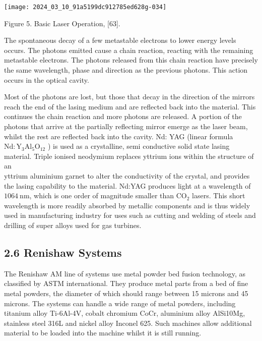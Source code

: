 \documentclass[10pt]{article}
\begin{document}
\begin{center}
\texttt{[image: 2024\_03\_10\_91a5199dc912785ed628g-034]}
\end{center}

Figure 5. Basic Laser Operation, [63].

The spontaneous decay of a few metastable electrons to lower energy levels occurs. The photons emitted cause a chain reaction, reacting with the remaining metastable electrons. The photons released from this chain reaction have precisely the same wavelength, phase and direction as the previous photons. This action occurs in the optical cavity.

Most of the photons are lost, but those that decay in the direction of the mirrors reach the end of the lasing medium and are reflected back into the material. This continues the chain reaction and more photons are released. A portion of the photons that arrive at the partially reflecting mirror emerge as the laser beam, whilst the rest are reflected back into the cavity. Nd: YAG (linear formula $\mathrm{Nd}: \mathrm{Y}_{3} \mathrm{Al}_{5} \mathrm{O}_{12}$ ) is used as a crystalline, semi conductive solid state lasing material. Triple ionised neodymium replaces yttrium ions within the structure of an\\
yttrium aluminium garnet to alter the conductivity of the crystal, and provides the lasing capability to the material. Nd:YAG produces light at a wavelength of $1064 \mathrm{~nm}$, which is one order of magnitude smaller than $\mathrm{CO}_{2}$ lasers. This short wavelength is more readily absorbed by metallic components and is thus widely used in manufacturing industry for uses such as cutting and welding of steels and drilling of super alloys used for gas turbines.

\subsection*{2.6 Renishaw Systems}
The Renishaw AM line of systems use metal powder bed fusion technology, as classified by ASTM international. They produce metal parts from a bed of fine metal powders, the diameter of which should range between 15 microns and 45 microns. The systems can handle a wide range of metal powders, including titanium alloy Ti-6Al-4V, cobalt chromium CoCr, aluminium alloy AlSi10Mg, stainless steel 316L and nickel alloy Inconel 625. Such machines allow additional material to be loaded into the machine whilst it is still running.
\end{document}
